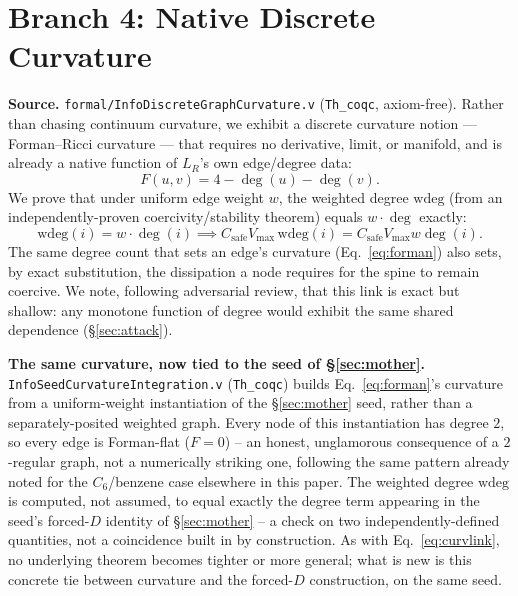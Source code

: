 \documentclass[10pt,twocolumn]{article}
\begin{document}
\section{Branch 4: Native Discrete Curvature}
\label{sec:curvature}
\textbf{Source.} \texttt{formal/InfoDiscreteGraphCurvature.v} (\texttt{Th\_coqc},
axiom-free). Rather than chasing continuum curvature, we exhibit a discrete curvature
notion --- Forman--Ricci curvature \cite{forman2003} --- that requires no derivative,
limit, or manifold, and is already a native function of $L_R$'s own edge/degree data:
\begin{equation}
F(u,v) = 4 - \deg(u) - \deg(v).
\label{eq:forman}
\end{equation}
We prove that under uniform edge weight $w$, the weighted degree
$\mathrm{wdeg}$ (from an independently-proven coercivity/stability theorem) equals
$w\cdot\deg$ exactly:
\begin{equation}
\mathrm{wdeg}(i) = w\cdot\deg(i) \implies C_{\mathrm{safe}}V_{\max}\,\mathrm{wdeg}(i) = C_{\mathrm{safe}}V_{\max}w\deg(i).
\label{eq:curvlink}
\end{equation}
The same degree count that sets an edge's curvature (Eq.~\ref{eq:forman}) also sets,
by exact substitution, the dissipation a node requires for the spine to remain
coercive. We note, following adversarial review, that this link is exact but shallow:
any monotone function of degree would exhibit the same shared dependence
(\S\ref{sec:attack}).

\textbf{The same curvature, now tied to the seed of \S\ref{sec:mother}.}
\texttt{InfoSeedCurvatureIntegration.v} (\texttt{Th\_coqc}) builds Eq.~\ref{eq:forman}'s
curvature from a uniform-weight instantiation of the \S\ref{sec:mother} seed, rather than a
separately-posited weighted graph. Every node of this instantiation has degree $2$, so every
edge is Forman-flat ($F=0$) -- an honest, unglamorous consequence of a $2$-regular graph, not a
numerically striking one, following the same pattern already noted for the $C_6$/benzene case
elsewhere in this paper. The weighted degree $\mathrm{wdeg}$ is computed, not assumed, to equal
exactly the degree term appearing in the seed's forced-$D$ identity of \S\ref{sec:mother} -- a
check on two independently-defined quantities, not a coincidence built in by construction. As
with Eq.~\ref{eq:curvlink}, no underlying theorem becomes tighter or more general; what is new is
this concrete tie between curvature and the forced-$D$ construction, on the same seed.
\end{document}

